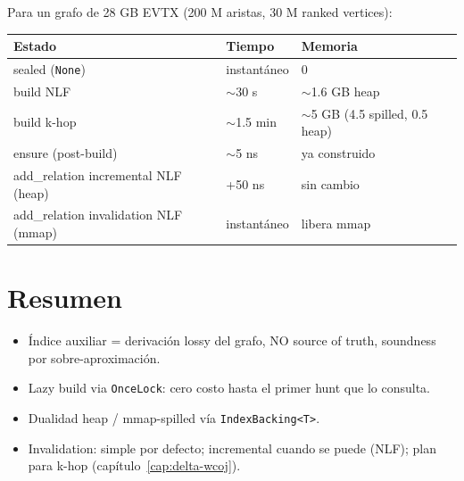 Para un grafo de 28 GB EVTX (200 M aristas, 30 M ranked vertices):

\begin{center}
\renewcommand{\arraystretch}{1.2}
\begin{tabular}{lll}
\toprule
\textbf{Estado} & \textbf{Tiempo} & \textbf{Memoria} \\
\midrule
sealed (\texttt{None}) & instantáneo & 0 \\
build NLF & $\sim$30 s & $\sim$1.6 GB heap \\
build k-hop & $\sim$1.5 min & $\sim$5 GB (4.5 spilled, 0.5 heap) \\
ensure (post-build) & $\sim$5 ns & ya construido \\
add\_relation incremental NLF (heap) & +50 ns & sin cambio \\
add\_relation invalidation NLF (mmap) & instantáneo & libera mmap \\
\bottomrule
\end{tabular}
\end{center}

\section{Resumen}

\begin{itemize}
    \item Índice auxiliar = derivación lossy del grafo, NO source
    of truth, soundness por sobre-aproximación.
    \item Lazy build via \texttt{OnceLock}: cero costo hasta el
    primer hunt que lo consulta.
    \item Dualidad heap / mmap-spilled vía \texttt{IndexBacking<T>}.
    \item Invalidation: simple por defecto; incremental cuando se
    puede (NLF); plan para k-hop (capítulo~\ref{cap:delta-wcoj}).
\end{itemize}

